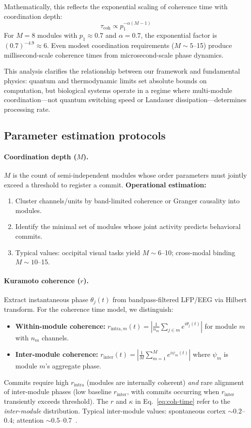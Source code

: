 \documentclass[12pt]{article}
\begin{document}
Mathematically, this reflects the exponential scaling of coherence time with coordination depth:
\[
\tau_{\mathrm{coh}} \propto p_1^{-\alpha(M-1)}
\]
For $M = 8$ modules with $p_1 \approx 0.7$ and $\alpha = 0.7$, the exponential factor is $(0.7)^{-4.9} \approx 6$. Even modest coordination requirements ($M \sim 5$--15) produce millisecond-scale coherence times from microsecond-scale phase dynamics.

This analysis clarifies the relationship between our framework and fundamental physics: quantum and thermodynamic limits set absolute bounds on computation, but biological systems operate in a regime where multi-module coordination---not quantum switching speed or Landauer dissipation---determines processing rate.

\subsection{Parameter estimation protocols}

\paragraph{Coordination depth ($M$).} $M$ is the count of semi-independent modules whose order parameters must jointly exceed a threshold to register a commit.
\textbf{Operational estimation:}
\begin{enumerate}
\item Cluster channels/units by band-limited coherence or Granger causality into modules.
\item Identify the minimal set of modules whose joint activity predicts behavioral commits.
\item Typical values: occipital visual tasks yield $M \sim 6$--10; cross-modal binding $M \sim 10$--15.
\end{enumerate}

\paragraph{Kuramoto coherence ($r$).} Extract instantaneous phase $\theta_j(t)$ from bandpass-filtered LFP/EEG via Hilbert transform. For the coherence time model, we distinguish:
\begin{itemize}
\item \textbf{Within-module coherence:} $r_{\mathrm{intra},m}(t) = \left|\frac{1}{n_m}\sum_{j \in m} e^{i\theta_j(t)}\right|$ for module $m$ with $n_m$ channels.
\item \textbf{Inter-module coherence:} $r_{\mathrm{inter}}(t) = \left|\frac{1}{M}\sum_{m=1}^M e^{i\psi_m(t)}\right|$ where $\psi_m$ is module $m$'s aggregate phase.
\end{itemize}
Commits require high $r_{\mathrm{intra}}$ (modules are internally coherent) \emph{and} rare alignment of inter-module phases (low baseline $r_{\mathrm{inter}}$, with commits occurring when $r_{\mathrm{inter}}$ transiently exceeds threshold). The $r$ and $\kappa$ in Eq.~\ref{eq:coh-time} refer to the \emph{inter-module} distribution. Typical inter-module values: spontaneous cortex $\sim 0.2$--0.4; attention $\sim 0.5$--0.7~\cite{fries2015}.
\end{document}
